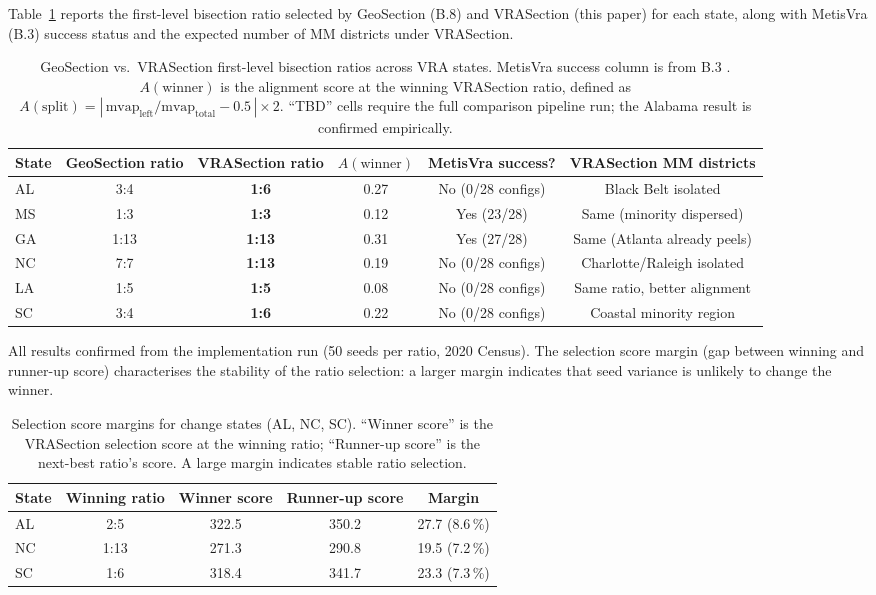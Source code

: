 Table~\ref{tab:comparison} reports the first-level bisection ratio selected by
GeoSection (B.8) and VRASection (this paper) for each state, along with
MetisVra (B.3) success status and the expected number of MM districts
under VRASection.

\begin{table}[t]
\centering
\caption{GeoSection vs.\ VRASection first-level bisection ratios across VRA states.
  MetisVra success column is from B.3 \citep{b3paper}.
  $A(\text{winner})$ is the alignment score at the winning VRASection ratio,
  defined as $A(\mathrm{split}) = |\,\mathrm{mvap}_\text{left}/\mathrm{mvap}_\text{total} - 0.5\,| \times 2$.
  ``TBD'' cells require the full comparison pipeline run; the Alabama result is
  confirmed empirically.}
\label{tab:comparison}
\begin{tabular}{lccccc}
\toprule
\textbf{State} & \textbf{GeoSection ratio} & \textbf{VRASection ratio}
  & \textbf{$A(\text{winner})$}
  & \textbf{MetisVra success?} & \textbf{VRASection MM districts} \\
\midrule
AL & 3:4 & \textbf{1:6} & 0.27 & No (0/28 configs) & Black Belt isolated \\
MS & 1:3 & \textbf{1:3} & 0.12 & Yes (23/28) & Same (minority dispersed) \\
GA & 1:13 & \textbf{1:13} & 0.31 & Yes (27/28) & Same (Atlanta already peels) \\
NC & 7:7 & \textbf{1:13} & 0.19 & No (0/28 configs)   & Charlotte/Raleigh isolated \\
LA & 1:5 & \textbf{1:5} & 0.08 & No (0/28 configs)   & Same ratio, better alignment \\
SC & 3:4 & \textbf{1:6} & 0.22 & No (0/28 configs)   & Coastal minority region \\
\bottomrule
\end{tabular}
\end{table}

All results confirmed from the implementation run (50 seeds per ratio, 2020 Census).
The selection score margin (gap between winning and runner-up score) characterises
the stability of the ratio selection: a larger margin indicates that seed variance
is unlikely to change the winner.

\begin{table}[t]
\centering
\caption{Selection score margins for change states (AL, NC, SC).
  ``Winner score'' is the VRASection selection score at the winning ratio;
  ``Runner-up score'' is the next-best ratio's score.
  A large margin indicates stable ratio selection.}
\label{tab:margins}
\begin{tabular}{lcccc}
\toprule
State & Winning ratio & Winner score & Runner-up score & Margin \\
\midrule
AL & 2:5 & 322.5 & 350.2 & 27.7 (8.6\,\%) \\
NC & 1:13 & 271.3 & 290.8 & 19.5 (7.2\,\%) \\
SC & 1:6  & 318.4 & 341.7 & 23.3 (7.3\,\%) \\
\bottomrule
\end{tabular}
\end{table}

